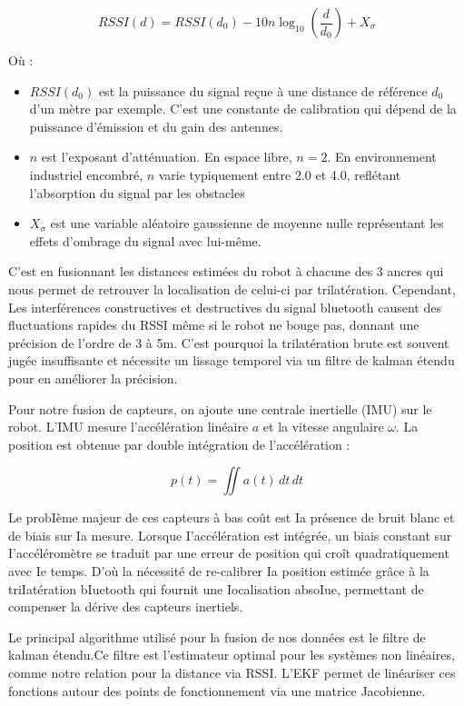 \documentclass[11pt, a4paper]{article}
\begin{document}
$$RSSI(d) = RSSI(d_0) - 10n \log_{10}\left(\frac{d}{d_0}\right) + X_\sigma$$

Où :
\begin{itemize}
	\item $RSSI(d_0)$ est la puissance du signal reçue à une distance de référence $d_0$ d’un mètre par exemple. C'est une constante de calibration qui dépend de la puissance d'émission et du gain des antennes.
	\item $n$ est l'exposant d'atténuation. En espace libre, $n=2$. En environnement industriel encombré, $n$ varie typiquement entre 2.0 et 4.0, reflétant l'absorption du signal par les obstacles
	\item $X_\sigma$ est une variable aléatoire gaussienne de moyenne nulle représentant les effets d'ombrage du signal avec lui-même.
\end{itemize}

C’est en fusionnant les distances estimées du robot à chacune des 3 ancres qui nous permet de retrouver la localisation de celui-ci par trilatération. Cependant, Les interférences constructives et destructives du signal bluetooth causent des fluctuations rapides du RSSI même si le robot ne bouge pas, donnant une précision de l’ordre de 3 à 5m. C'est pourquoi la trilatération brute est souvent jugée insuffisante et nécessite un lissage temporel via un filtre de kalman étendu pour en améliorer la précision.

Pour notre fusion de capteurs, on ajoute une centrale inertielle (IMU) sur le robot. L'IMU mesure l'accélération linéaire $a$ et la vitesse angulaire $\omega$. La position est obtenue par double intégration de l'accélération :

$$p(t) = \iint a(t) \, dt \, dt$$

Le probIème majeur de ces capteurs à bas coût est Ia présence de bruit blanc et de biais sur Ia mesure. Lorsque I’accélération est intégrée, un biais constant sur I'accéléromètre se traduit par une erreur de position qui croît quadratiquement avec Ie temps. D'où la nécessité de re-calibrer Ia position estimée grâce à la triIatération bIuetooth qui fournit une Iocalisation absoIue, permettant de compenser la dérive des capteurs inertiels.

Le principal algorithme utilisé pour la fusion de nos données est le filtre de kalman étendu.Ce filtre est l'estimateur optimal pour les systèmes non linéaires, comme notre relation pour la distance via RSSI. L'EKF permet de linéariser ces fonctions autour des points de fonctionnement via une matrice Jacobienne.
\end{document}
